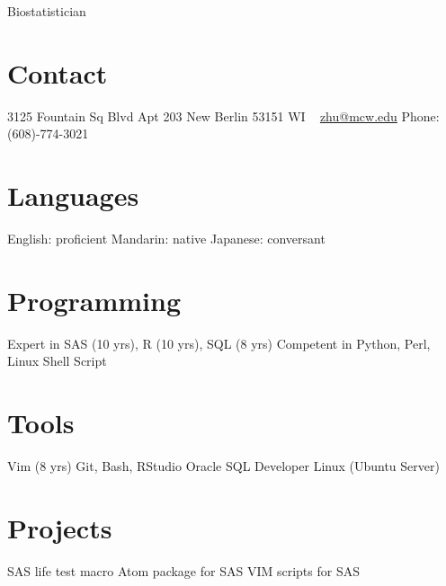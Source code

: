 \documentclass[11pt, print]{friggeri-cv}
\begin{document}
       {Biostatistician}

\begin{aside}
  \section{Contact}
    3125 Fountain Sq Blvd
    Apt 203
    New Berlin
    53151 WI
    ~
    \href{mailto:zhu@mcw.edu}{zhu@mcw.edu}
    Phone: (608)-774-3021
  \section{Languages}
    English: proficient
    Mandarin: native
    Japanese: conversant
  \section{Programming}
    Expert in SAS (10 yrs),
    R (10 yrs), SQL (8 yrs)
    Competent in Python,
    Perl, Linux Shell Script
  \section{Tools}
    Vim (8 yrs)
    Git, Bash, RStudio
    Oracle SQL Developer
    Linux (Ubuntu Server)
  \section{Projects}
    SAS life test macro
    Atom package for SAS
    VIM scripts for SAS
\end{aside}


\end{document}
